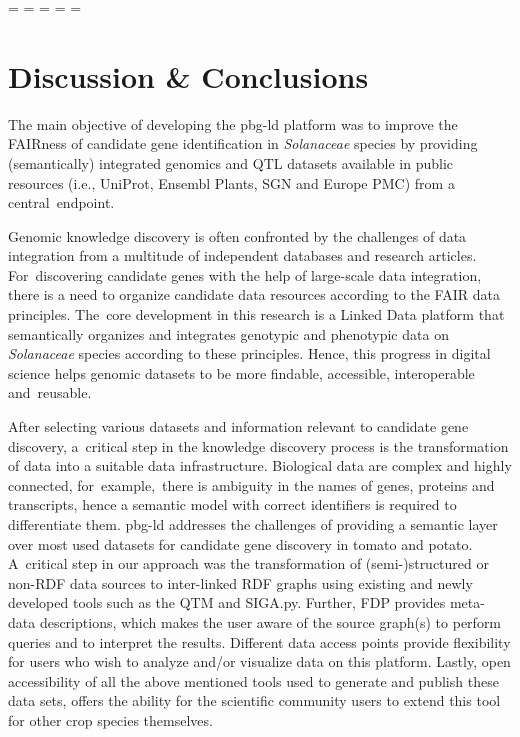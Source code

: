 \documentclass[applsci,article,accept,moreauthors,pdftex]{Definitions/mdpi}
\begin{document}
{%


\newpage
\restoregeometry
\paperwidth=\pdfpageheight
\paperheight=\pdfpagewidth
\pdfpageheight=\paperheight
\pdfpagewidth=\paperwidth
\headwidth=\textwidth



\section{Discussion \& Conclusions}
The main objective of developing the pbg-ld platform was to improve the FAIRness of candidate gene identification in \textit{Solanaceae} %
species by providing (semantically) integrated genomics and QTL datasets available in public resources (i.e., UniProt, Ensembl Plants, SGN and Europe PMC) from a central~endpoint. 

Genomic knowledge discovery is often confronted by the challenges of data integration from a multitude of independent databases and research articles. For~discovering candidate genes with the help of large-scale data integration, there is a need to organize candidate data resources according to the FAIR data principles.
The~core development in this research is a Linked Data %
platform that semantically organizes and integrates genotypic and phenotypic data on \textit{Solanaceae} %
species according to these principles. Hence, this progress in digital science helps genomic datasets to be more findable, accessible, interoperable and~reusable.

After selecting various datasets and information relevant to candidate gene discovery, a~critical step in the knowledge discovery process is the transformation of data into a suitable data infrastructure.
Biological data are %
complex and highly connected, for~example,~there is %
ambiguity in the names of genes, proteins and transcripts, %
hence a semantic model with correct identifiers is required to differentiate them. pbg-ld %
addresses the challenges of providing a semantic layer over most used datasets for candidate gene discovery in tomato and potato. A~critical step in our approach was the transformation of (semi-)structured or non-RDF data sources to inter-linked RDF graphs using existing and newly developed tools such as the QTM and SIGA.py.
Further, FDP provides meta-data descriptions, which makes the user aware of the source graph(s) %
to perform queries and to interpret the results.
Different data access points provide flexibility for users who wish to analyze and/or visualize data on this platform.
Lastly, open accessibility of all the above mentioned tools used to generate and publish these data sets, offers the ability for the scientific community users to extend this tool for other crop species themselves. 

}
\end{document}
